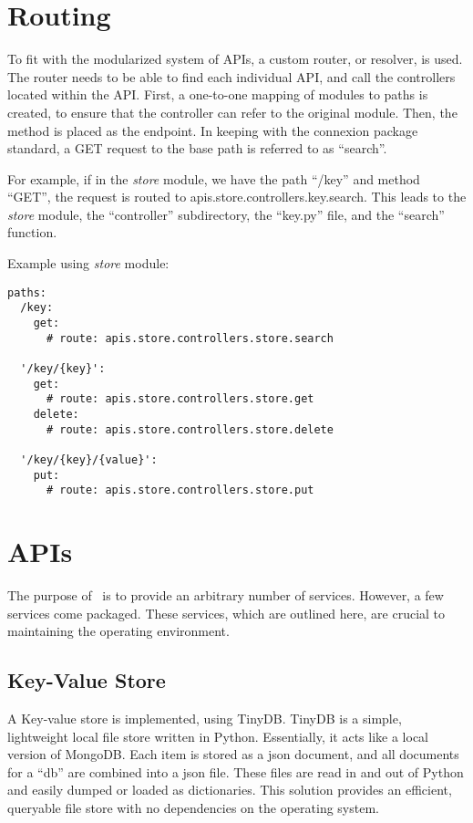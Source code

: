 \section{Routing}

To fit with the modularized system of APIs, a custom router, or resolver,
is used. The router needs to be able to find each individual API, and call
the controllers located within the API. First, a one-to-one mapping of
modules to paths is created, to ensure that the controller can refer to the
original module. Then, the method is placed as the endpoint. In keeping with
the connexion package standard, a GET request to the base path is referred
to as ``search''.

For example, if in the \textit{store} module, we have the
path ``/key'' and method ``GET'', the request is routed to
apis.store.controllers.key.search. This leads to the \textit{store} module, the
``controller'' subdirectory, the ``key.py'' file, and the ``search'' function.

Example using \textit{store} module:
\begin{verbatim}
paths:
  /key:
    get:
      # route: apis.store.controllers.store.search

  '/key/{key}':
    get:
      # route: apis.store.controllers.store.get
    delete:
      # route: apis.store.controllers.store.delete

  '/key/{key}/{value}':
    put:
      # route: apis.store.controllers.store.put
\end{verbatim}

\section{APIs}

The purpose of \projectname~is to provide an arbitrary number of
services. However, a few services come packaged. These services, which are
outlined here, are crucial to maintaining the operating environment.

\subsection{Key-Value Store}

A Key-value store is implemented, using TinyDB. TinyDB is a simple, lightweight
local file store written in Python. Essentially, it acts like a local version
of MongoDB. Each item is stored as a json document, and all documents for a
``db'' are combined into a json file. These files are read in and out of
Python and easily dumped or loaded as dictionaries. This solution provides
an efficient, queryable file store with no dependencies on the operating
system.\cite{hid-sp18-526-www-tinydb}

